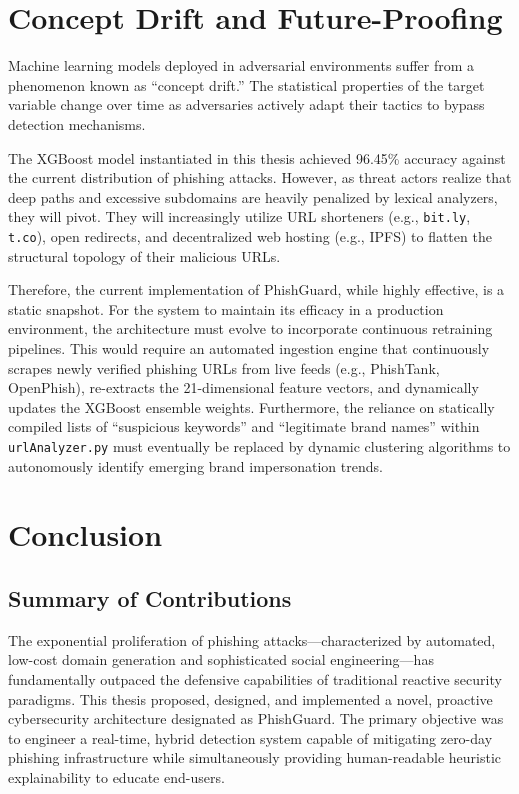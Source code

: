 \section{Concept Drift and
Future-Proofing}\label{concept-drift-and-future-proofing}

Machine learning models deployed in adversarial environments suffer from
a phenomenon known as ``concept drift.'' The statistical properties of
the target variable change over time as adversaries actively adapt their
tactics to bypass detection mechanisms.

The XGBoost model instantiated in this thesis achieved 96.45\% accuracy
against the current distribution of phishing attacks. However, as threat
actors realize that deep paths and excessive subdomains are heavily
penalized by lexical analyzers, they will pivot. They will increasingly
utilize URL shorteners (e.g., \texttt{bit.ly}, \texttt{t.co}), open
redirects, and decentralized web hosting (e.g., IPFS) to flatten the
structural topology of their malicious URLs.

Therefore, the current implementation of PhishGuard, while highly
effective, is a static snapshot. For the system to maintain its efficacy
in a production environment, the architecture must evolve to incorporate
continuous retraining pipelines. This would require an automated
ingestion engine that continuously scrapes newly verified phishing URLs
from live feeds (e.g., PhishTank, OpenPhish), re-extracts the
21-dimensional feature vectors, and dynamically updates the XGBoost
ensemble weights. Furthermore, the reliance on statically compiled lists
of ``suspicious keywords'' and ``legitimate brand names'' within
\texttt{urlAnalyzer.py} must eventually be replaced by dynamic
clustering algorithms to autonomously identify emerging brand
impersonation trends. 

\section{Conclusion}

\subsection{Summary of Contributions}\label{summary-of-contributions}

The exponential proliferation of phishing attacks---characterized by
automated, low-cost domain generation and sophisticated social
engineering---has fundamentally outpaced the defensive capabilities of
traditional reactive security paradigms. This thesis proposed, designed,
and implemented a novel, proactive cybersecurity architecture designated
as PhishGuard. The primary objective was to engineer a real-time, hybrid
detection system capable of mitigating zero-day phishing infrastructure
while simultaneously providing human-readable heuristic explainability
to educate end-users.


